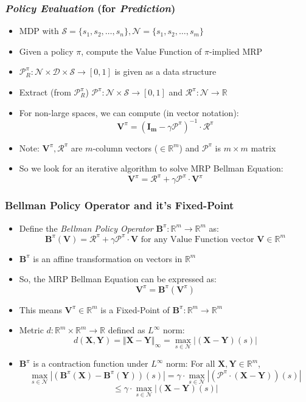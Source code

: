 \documentclass[handout]{beamer}
\newcommand{\bvpi}{\bm{V}^{\pi}}
\newcommand{\bbpi}{\bm{B}^{\pi}}
\newcommand{\bv}{\bm{V}}
\begin{document}
\begin{frame}
\frametitle{{\em Policy Evaluation} (for {\em Prediction})}
\pause
\begin{itemize}[<+->]
\item MDP with $\mathcal{S} = \{s_1, s_2, \ldots, s_n\}, \mathcal{N} = \{s_1, s_2, \ldots, s_m \}$
\item Given a policy $\pi$, compute the Value Function of $\pi$-implied MRP
\item $\mathcal{P}_R^{\pi}: \mathcal{N} \times \mathcal{D} \times \mathcal{S} \rightarrow [0, 1]$ is given as a data structure
\item Extract (from $\mathcal{P}_R^{\pi}$) $\mathcal{P}^{\pi}: \mathcal{N} \times \mathcal{S} \rightarrow [0, 1]$ and  $\mathcal{R}^{\pi}: \mathcal{N} \rightarrow \mathbb{R}$
\item For non-large spaces, we can compute (in vector notation):
$${\bm V}^{\pi} = (\bm{I_m} - \gamma \bm{\mathcal{P}}^{\pi})^{-1} \cdot \bm{\mathcal{R}}^{\pi}$$
\item Note: $\bvpi, \bm{\mathcal{R}}^{\pi}$ are $m$-column vectors ($\in \mathbb{R}^m$) and $\bm{\mathcal{P}}^{\pi}$ is $m \times m$ matrix
\item So we look for an iterative algorithm to solve MRP Bellman Equation:
$$\bvpi  = \bm{\mathcal{R}}^{\pi} + \gamma \bm{\mathcal{P}}^{\pi} \cdot \bvpi$$
\end{itemize}
\end{frame}

\begin{frame}
\frametitle{Bellman Policy Operator and it's Fixed-Point}
\pause
\begin{itemize}[<+->]
\item Define the {\em Bellman Policy Operator} $\bbpi: \mathbb{R}^m \rightarrow \mathbb{R}^m$ as:
$$\bbpi(\bv) = \bm{\mathcal{R}}^{\pi} + \gamma \bm{\mathcal{P}}^{\pi} \cdot \bv \text{ for any Value Function vector } \bv \in \mathbb{R}^m$$
\item $\bbpi$ is an affine transformation on vectors in $\mathbb{R}^m$
\item So, the MRP Bellman Equation can be expressed as:
$$\bvpi = \bbpi(\bvpi)$$
\item This means $\bvpi \in \mathbb{R}^m$ is a Fixed-Point of $\bbpi: \mathbb{R}^m \rightarrow \mathbb{R}^m$
\item Metric $d: \mathbb{R}^m \times \mathbb{R}^m \rightarrow \mathbb{R}$ defined as $L^{\infty}$ norm:
$$d(\bm{X}, \bm{Y}) = \Vert \bm{X} - \bm{Y} \Vert_{\infty} = \max_{s \in \mathcal{N}} |(\bm{X} - \bm{Y})(s)|$$
\item $\bbpi$ is a contraction function under $L^{\infty}$ norm: For all $\bm{X}, \bm{Y} \in \mathbb{R}^m$,
$$\max_{s \in \mathcal{N}} |(\bbpi(\bm{X}) - \bbpi(\bm{Y}))(s)| = \gamma \cdot \max_{s \in \mathcal{N}} |(\bm{\mathcal{P}}^{\pi} \cdot (\bm{X} - \bm{Y}))(s)|$$
$$ \leq \gamma \cdot \max_{s \in \mathcal{N}} |(\bm{X} - \bm{Y})(s)|$$
\end{itemize}
\end{frame}
\end{document}
